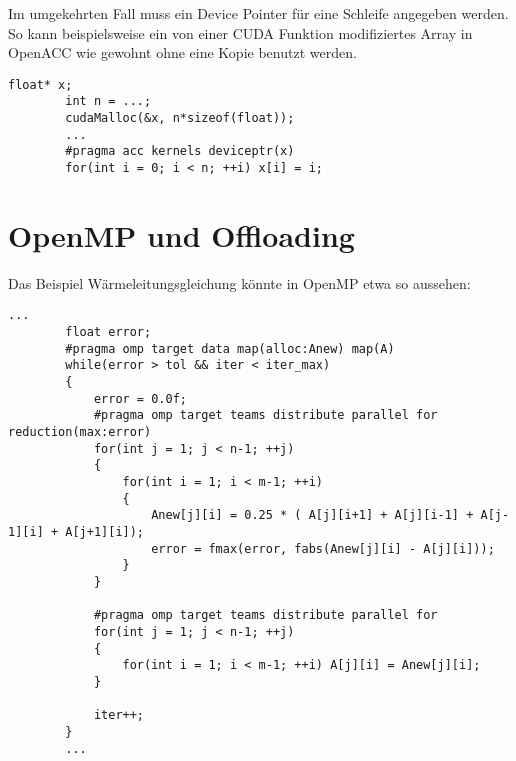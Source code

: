 		Im umgekehrten Fall muss ein Device Pointer für eine Schleife angegeben werden. So kann beispielsweise ein von einer CUDA Funktion modifiziertes Array in OpenACC wie gewohnt ohne eine Kopie benutzt werden.
		\begin{lstlisting}[caption=~OpenACC/CUDA Zusammenspiel: Device Memory]
		float* x;
		int n = ...;
		cudaMalloc(&x, n*sizeof(float));
		...
		#pragma acc kernels deviceptr(x)
		for(int i = 0; i < n; ++i) x[i] = i;
		\end{lstlisting}
			
		\newpage
		\section{OpenMP und Offloading}
		Das Beispiel Wärmeleitungsgleichung könnte in OpenMP etwa so aussehen:
		\begin{lstlisting}[caption=~OpenMP: Offloading]
		...
		float error;
		#pragma omp target data map(alloc:Anew) map(A)
		while(error > tol && iter < iter_max)
		{
			error = 0.0f;
			#pragma omp target teams distribute parallel for reduction(max:error)
			for(int j = 1; j < n-1; ++j)
			{
				for(int i = 1; i < m-1; ++i)
				{
					Anew[j][i] = 0.25 * ( A[j][i+1] + A[j][i-1] + A[j-1][i] + A[j+1][i]);
					error = fmax(error, fabs(Anew[j][i] - A[j][i]));
				}
			}
			
			#pragma omp target teams distribute parallel for
			for(int j = 1; j < n-1; ++j)
			{
				for(int i = 1; i < m-1; ++i) A[j][i] = Anew[j][i];
			}
			
			iter++;
		}
		...
		\end{lstlisting}
